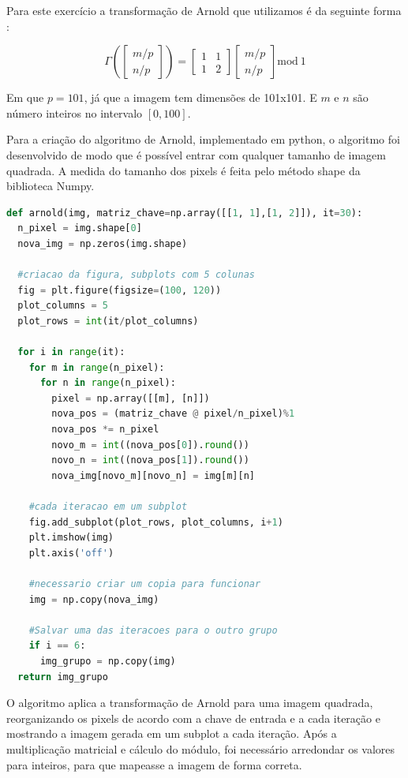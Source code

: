 \documentclass[a4paper, 12pt]{article}
\begin{document}
Para este exercício a transformação de Arnold que utilizamos é da seguinte forma \citep{anton}:

$$\Gamma \left(\begin{bmatrix}
m/p\\
n/p
\end{bmatrix}\right)=\begin{bmatrix}
1&1\\
1&2
\end{bmatrix}\begin{bmatrix}
m/p\\
n/p
\end{bmatrix}\mathrm{mod\ 1}$$

Em que $p = 101$, já que a imagem tem dimensões de 101x101. E $m$ e $n$ são número inteiros no intervalo $[0, 100]$.

Para a criação do algoritmo de Arnold, implementado em python, o algoritmo foi desenvolvido de modo que é possível entrar com qualquer tamanho de imagem quadrada. A medida do tamanho dos pixels é feita pelo método shape da biblioteca Numpy.

\begin{lstlisting}[language=Python, caption = Algoritmo de Arnold]
def arnold(img, matriz_chave=np.array([[1, 1],[1, 2]]), it=30):
  n_pixel = img.shape[0]
  nova_img = np.zeros(img.shape)

  #criacao da figura, subplots com 5 colunas
  fig = plt.figure(figsize=(100, 120))
  plot_columns = 5
  plot_rows = int(it/plot_columns)

  for i in range(it):
    for m in range(n_pixel):
      for n in range(n_pixel):
        pixel = np.array([[m], [n]])
        nova_pos = (matriz_chave @ pixel/n_pixel)%1
        nova_pos *= n_pixel
        novo_m = int((nova_pos[0]).round())
        novo_n = int((nova_pos[1]).round())
        nova_img[novo_m][novo_n] = img[m][n]

    #cada iteracao em um subplot
    fig.add_subplot(plot_rows, plot_columns, i+1)
    plt.imshow(img)
    plt.axis('off')

    #necessario criar um copia para funcionar
    img = np.copy(nova_img)

    #Salvar uma das iteracoes para o outro grupo
    if i == 6:
      img_grupo = np.copy(img)
  return img_grupo
\end{lstlisting}

O algoritmo aplica a transformação de Arnold para uma imagem quadrada, reorganizando os pixels de acordo com a chave de entrada e a cada iteração e mostrando a imagem gerada em um subplot a cada iteração. Após a multiplicação matricial e cálculo do módulo, foi necessário arredondar os valores para inteiros, para que mapeasse a imagem de forma correta.
\end{document}
